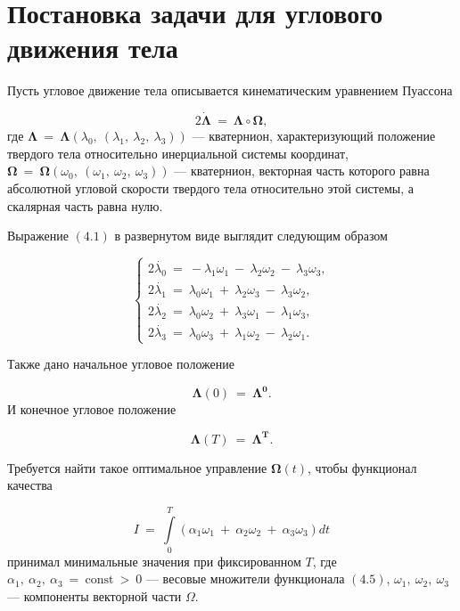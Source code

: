 \documentclass[14pt]{extreport}
\begin{document}
\newpage

\chapter{Постановка задачи для углового движения тела}
Пусть угловое движение тела описывается кинематическим уравнением Пуассона

\begin{equation}
2\dot{\boldsymbol\Lambda}\ =\ \boldsymbol\Lambda \circ \boldsymbol\Omega,
\end{equation}
где $\boldsymbol\Lambda\ =\ \boldsymbol\Lambda(\lambda_0,\ (\lambda_1,\ \lambda_2,\ \lambda_3))$ --- кватернион, характеризующий положение твердого тела относительно инерциальной системы координат,
$\boldsymbol\Omega\ =\ \boldsymbol\Omega(\omega_0,\ (\omega_1,\ \omega_2,\ \omega_3))$ --- кватернион, векторная часть которого равна абсолютной угловой скорости твердого тела относительно этой системы,
а скалярная часть равна нулю.

Выражение $(4.1)$ в развернутом виде выглядит следующим образом

\begin{equation}
\begin{cases}
2\dot{\lambda_0}\ =\ -\lambda_1\omega_1\ -\ \lambda_2\omega_2\ -\ \lambda_3\omega_3, \\
2\dot{\lambda_1}\ =\ \lambda_0\omega_1\ +\ \lambda_2\omega_3\ -\ \lambda_3\omega_2, \\
2\dot{\lambda_2}\ =\ \lambda_0\omega_2\ +\ \lambda_3\omega_1\ -\ \lambda_1\omega_3, \\
2\dot{\lambda_3}\ =\ \lambda_0\omega_3\ +\ \lambda_1\omega_2\ -\ \lambda_2\omega_1.
 \end{cases}
\end{equation}

Также дано начальное угловое положение 

\begin{equation}
\boldsymbol\Lambda(0)\ =\ \boldsymbol{\Lambda^0}.
\end{equation}
И конечное угловое положение

\begin{equation}
\boldsymbol\Lambda(T)\ =\ \boldsymbol{\Lambda^T}.
\end{equation}

Требуется найти такое оптимальное управление $\boldsymbol\Omega(t)$, чтобы функционал качества 

\begin{equation}
I\ =\ \int\limits_{0}^{T}(\alpha_1\omega_1\ +\ \alpha_2\omega_2\ +\ \alpha_3\omega_3)dt
\end{equation}
принимал минимальные значения при фиксированном $T$,
где $\alpha_1,\ \alpha_2,\ \alpha_3\ =\ \textrm{const}\ >\ 0$ --- весовые множители функционала $(4.5)$, $\omega_1,\ \omega_2,\ \omega_3$ 
--- компоненты векторной части $\Omega$.
\end{document}

